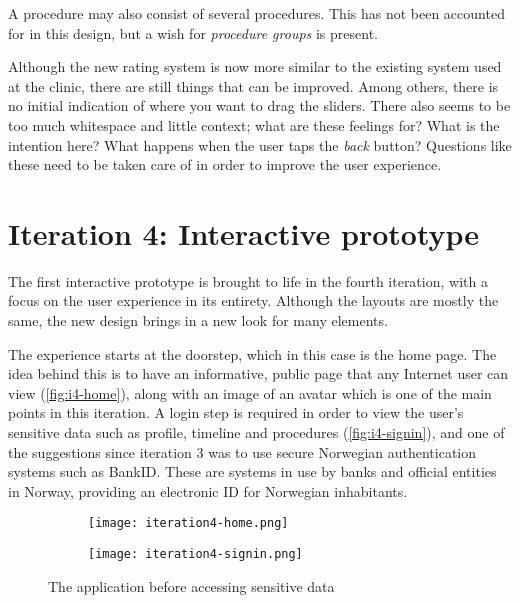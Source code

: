 A procedure may also consist of several procedures. This has not been accounted for in this design, but a wish for \emph{procedure groups} is present.

Although the new rating system is now more similar to the existing system used at the clinic, there are still things that can be improved. Among others, there is no initial indication of where you want to drag the sliders. There also seems to be too much whitespace and little context; what are these feelings for? What is the intention here? What happens when the user taps the \emph{back} button? Questions like these need to be taken care of in order to improve the user experience.

\section{Iteration 4: Interactive prototype}
\label{sec:iteration4}

The first interactive prototype is brought to life in the fourth iteration, with a focus on the user experience in its entirety. Although the layouts are mostly the same, the new design brings in a new look for many elements.

The experience starts at the doorstep, which in this case is the home page. The idea behind this is to have an informative, public page that any Internet user can view (\autoref{fig:i4-home}), along with an image of an avatar which is one of the main points in this iteration. A login step is required in order to view the user's sensitive data such as profile, timeline and procedures (\autoref{fig:i4-signin}), and one of the suggestions since iteration 3 was to use secure Norwegian authentication systems such as BankID. These are systems in use by banks and official entities in Norway, providing an electronic ID for Norwegian inhabitants.

\begin{sidewaysfigure}
    \centering
    \hspace{\fill}
    \begin{subfigure}[t]{0.4\textwidth}
        \vspace{0pt}
        \centering
        \texttt{[image: iteration4-home.png]}
        \label{fig:i4-home}
    \end{subfigure}
    \hspace{\fill}
    \begin{subfigure}[t]{0.4\textwidth}
        \vspace{0pt}
        \centering
        \texttt{[image: iteration4-signin.png]}
        \label{fig:i4-signin}
    \end{subfigure}
    \hspace*{\fill}
    \caption{The application before accessing sensitive data}
    \label{fig:i4-welcome}
\end{sidewaysfigure}

